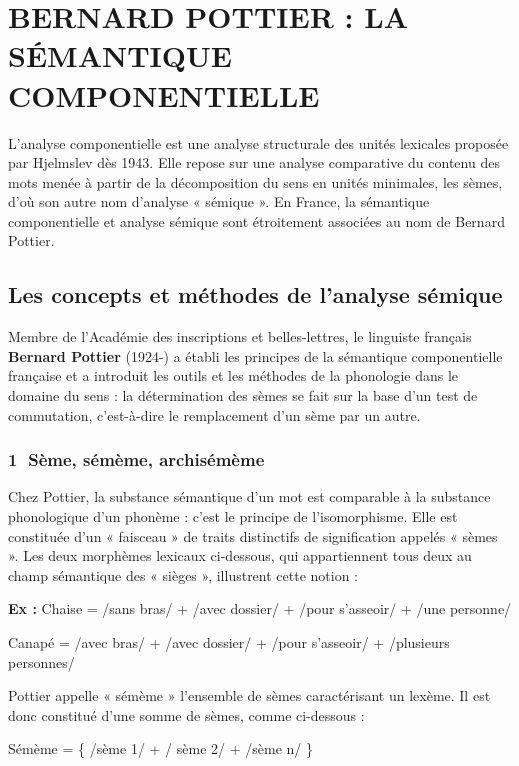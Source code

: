 \section{BERNARD POTTIER : LA SÉMANTIQUE COMPONENTIELLE}
L’analyse componentielle est une analyse structurale des unités lexicales proposée par Hjelmslev dès 1943. Elle repose sur une analyse comparative du contenu des mots menée à partir de la décomposition du sens en unités minimales, les sèmes, d’où son autre nom d’analyse « sémique ». En France, la sémantique componentielle et analyse sémique sont étroitement associées au nom de Bernard Pottier.

\subsection{Les concepts et méthodes de l’analyse sémique}
Membre de l’Académie des inscriptions et belles-lettres, le linguiste français \textbf{Bernard Pottier} (1924-) a établi les principes de la sémantique componentielle française et a introduit les outils et les méthodes
 de la phonologie dans le domaine du sens : la détermination des sèmes se fait sur la base d’un test de commutation, c’est-à-dire le remplacement d’un sème par un autre.

\subsubsection*{\textcircled{\scriptsize 1} Sème, sémème, archisémème}
Chez Pottier, la substance sémantique d’un mot est comparable à la substance phonologique d’un phonème : c’est le principe de l’isomorphisme. Elle est constituée d’un « faisceau » de traits distinctifs de signification appelés « sèmes ». Les deux morphèmes lexicaux ci-dessous, qui appartiennent tous deux au champ sémantique des « sièges », illustrent cette notion :

\noindent\textbf{Ex :} Chaise = /sans bras/ + /avec dossier/ + /pour s’asseoir/ + /une personne/

\noindent\hspace*{1.7em}Canapé = /avec bras/ + /avec dossier/ + /pour s’asseoir/ + /plusieurs personnes/

Pottier appelle « sémème » l’ensemble de sèmes caractérisant un lexème. Il est donc constitué d’une somme de sèmes, comme ci-dessous :

\noindent Sémème = \{ /sème 1/ + / sème 2/ + /sème n/ \}


